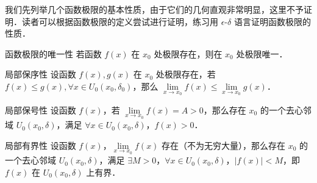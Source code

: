 

我们先列举几个函数极限的基本性质，由于它们的几何直观非常明显，这里不予证明．读者可以根据函数极限的定义尝试进行证明，练习用 $\epsilon$-$\delta$ 语言证明函数极限的性质．
\begin{theorem}{函数极限的唯一性}
  若函数 $f(x)$ 在 $x_0$ 处极限存在，则在 $x_0$ 处极限唯一．
\end{theorem}
\begin{theorem}{局部保序性}
设函数 $f(x),g(x)$ 在 $x_0$ 处极限存在，若 $f(x)\le g(x), \forall x\in U_0(x_0,\delta_0)$，那么 $\lim\limits_{x\rightarrow x_0} f(x)\le \lim\limits_{x\rightarrow x_0}g(x)$．
\end{theorem}
\begin{theorem}{局部保号性}
设函数 $f(x)$，若 $\lim\limits_{x\rightarrow x_0}f(x)=A>0$，那么存在 $x_0$ 的一个去心邻域 $U_0(x_0,\delta)$，满足 $\forall x\in U_0(x_0,\delta)$，$f(x)>0$．
\end{theorem}
\begin{theorem}{局部有界性}
设函数 $f(x)$，$\lim\limits_{x\rightarrow x_0}f(x)$ 存在（不为无穷大量），那么存在 $x_0$ 的一个去心邻域  $U_0(x_0,\delta)$，满足 $\exists M>0$，$\forall x\in U_0(x_0,\delta)$，$|f(x)|<M$，即 $f(x)$ 在 $U_0(x_0,\delta)$ 上有界．
\end{theorem}
